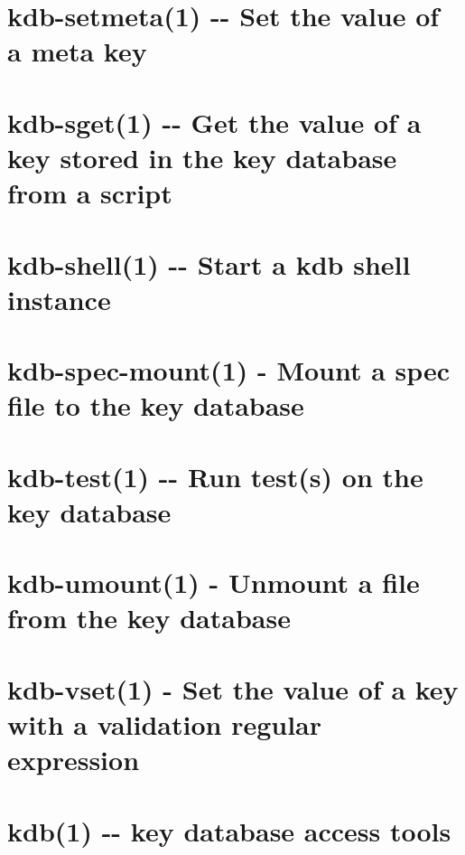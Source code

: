 \documentclass[twoside]{book}
\newcommand{\+}{\discretionary{\mbox{\scriptsize$\hookleftarrow$}}{}{}}
\begin{document}
\chapter{kdb-\/setmeta(1) -\/-\/ Set the value of a meta key}
\label{md_doc_help_kdb-setmeta}
\hypertarget{md_doc_help_kdb-setmeta}{}

\chapter{kdb-\/sget(1) -\/-\/ Get the value of a key stored in the key database from a script}
\label{md_doc_help_kdb-sget}
\hypertarget{md_doc_help_kdb-sget}{}

\chapter{kdb-\/shell(1) -\/-\/ Start a kdb shell instance}
\label{md_doc_help_kdb-shell}
\hypertarget{md_doc_help_kdb-shell}{}

\chapter{kdb-\/spec-\/mount(1) -\/ Mount a spec file to the key database}
\label{md_doc_help_kdb-spec-mount}
\hypertarget{md_doc_help_kdb-spec-mount}{}

\chapter{kdb-\/test(1) -\/-\/ Run test(s) on the key database}
\label{md_doc_help_kdb-test}
\hypertarget{md_doc_help_kdb-test}{}

\chapter{kdb-\/umount(1) -\/ Unmount a file from the key database}
\label{md_doc_help_kdb-umount}
\hypertarget{md_doc_help_kdb-umount}{}

\chapter{kdb-\/vset(1) -\/ Set the value of a key with a validation regular expression}
\label{md_doc_help_kdb-vset}
\hypertarget{md_doc_help_kdb-vset}{}

\chapter{kdb(1) -\/-\/ key database access tools}
\label{md_doc_help_kdb}
\hypertarget{md_doc_help_kdb}{}

\end{document}

